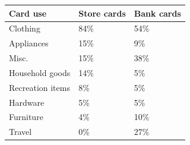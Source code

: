 \begin{tabular}[t]{lll}
\toprule
Card use & Store cards & Bank cards\\
\midrule
Clothing & 84\% & 54\%\\
Appliances & 15\% & 9\%\\
Misc. & 15\% & 38\%\\
Household goods & 14\% & 5\%\\
Recreation items & 8\% & 5\%\\
\addlinespace
Hardware & 5\% & 5\%\\
Furniture & 4\% & 10\%\\
Travel & 0\% & 27\%\\
\bottomrule
\end{tabular}
